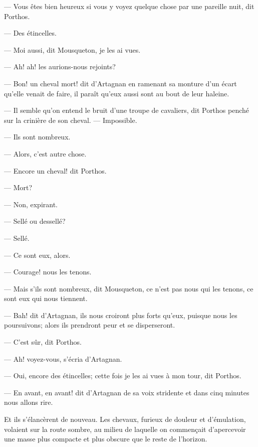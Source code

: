 — Vous êtes bien heureux si vous y voyez quelque chose par une pareille nuit, dit Porthos.

— Des étincelles.

— Moi aussi, dit Mousqueton, je les ai vues.

— Ah! ah! les aurions-nous rejoints?

— Bon! un cheval mort! dit d'Artagnan en ramenant sa monture d'un écart qu'elle venait de faire, il paraît qu'eux aussi sont au bout de leur haleine.

— Il semble qu'on entend le bruit d'une troupe de cavaliers, dit Porthos penché sur la crinière de son cheval.
— Impossible.

— Ils sont nombreux.

— Alors, c'est autre chose.

— Encore un cheval! dit Porthos.

— Mort?

— Non, expirant.

— Sellé ou dessellé?

— Sellé.

— Ce sont eux, alors.

— Courage! nous les tenons.

— Mais s'ils sont nombreux, dit Mousqueton, ce n'est pas nous qui les tenons, ce sont eux qui nous tiennent.

— Bah! dit d'Artagnan, ils nous croiront plus forts qu'eux, puisque nous les poursuivons; alors ils prendront peur et se disperseront.

— C'est sûr, dit Porthos.

— Ah! voyez-vous, s'écria d'Artagnan.

— Oui, encore des étincelles; cette fois je les ai vues à mon tour, dit Porthos.

— En avant, en avant! dit d'Artagnan de sa voix stridente et dans cinq minutes nous allons rire.

Et ils s'élancèrent de nouveau. Les chevaux, furieux de douleur et d'émulation, volaient sur la route sombre, au milieu de laquelle on commençait d'apercevoir une masse plus compacte et plus obscure que le reste de l'horizon.